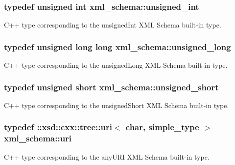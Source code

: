 \subsubsection[{unsigned\+\_\+int}]{\setlength{\rightskip}{0pt plus 5cm}typedef unsigned int {\bf xml\+\_\+schema\+::unsigned\+\_\+int}}\label{namespacexml__schema_a85ca3205d8af287e149aac54535f57e7}


C++ type corresponding to the unsigned\+Int X\+M\+L Schema built-\/in type. 

\hypertarget{namespacexml__schema_a4413fbcf4c65ffc7aaafe465d72fcb33}{}
\subsubsection[{unsigned\+\_\+long}]{\setlength{\rightskip}{0pt plus 5cm}typedef unsigned long long {\bf xml\+\_\+schema\+::unsigned\+\_\+long}}\label{namespacexml__schema_a4413fbcf4c65ffc7aaafe465d72fcb33}


C++ type corresponding to the unsigned\+Long X\+M\+L Schema built-\/in type. 

\hypertarget{namespacexml__schema_a7fc7b4a846c512c370346e15dfdcecaa}{}
\subsubsection[{unsigned\+\_\+short}]{\setlength{\rightskip}{0pt plus 5cm}typedef unsigned short {\bf xml\+\_\+schema\+::unsigned\+\_\+short}}\label{namespacexml__schema_a7fc7b4a846c512c370346e15dfdcecaa}


C++ type corresponding to the unsigned\+Short X\+M\+L Schema built-\/in type. 

\hypertarget{namespacexml__schema_a2518fddf119bd258d7443408863ee457}{}
\subsubsection[{uri}]{\setlength{\rightskip}{0pt plus 5cm}typedef \+::xsd\+::cxx\+::tree\+::uri$<$ char, {\bf simple\+\_\+type} $>$ {\bf xml\+\_\+schema\+::uri}}\label{namespacexml__schema_a2518fddf119bd258d7443408863ee457}


C++ type corresponding to the any\+U\+R\+I X\+M\+L Schema built-\/in type. 

